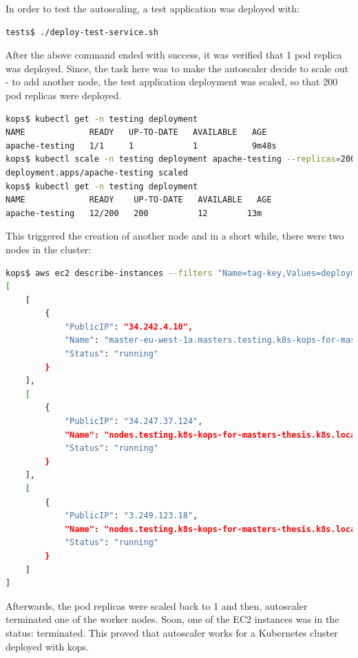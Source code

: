 In order to test the autoscaling, a test application was deployed with:
\begin{lstlisting}[basicstyle=\tiny,caption={TODO},captionpos=b,language=Bash,xleftmargin=1cm]
tests$ ./deploy-test-service.sh
\end{lstlisting}
After the above command ended with success, it was verified that 1 pod replica was deployed. Since, the task here was to make the autoscaler decide to scale out - to add another node, the test application deployment was scaled, so that 200 pod replicas were deployed.
\begin{lstlisting}[basicstyle=\tiny,caption={TODO},captionpos=b,language=Bash,xleftmargin=1cm]
kops$ kubectl get -n testing deployment
NAME             READY   UP-TO-DATE   AVAILABLE   AGE
apache-testing   1/1     1            1           9m48s
kops$ kubectl scale -n testing deployment apache-testing --replicas=200
deployment.apps/apache-testing scaled
kops$ kubectl get -n testing deployment
NAME             READY    UP-TO-DATE   AVAILABLE   AGE
apache-testing   12/200   200          12        13m
\end{lstlisting}
This triggered the creation of another node and in a short while, there were two nodes in the cluster:
\begin{lstlisting}[basicstyle=\tiny,caption={TODO},captionpos=b,language=Bash,xleftmargin=1cm]
kops$ aws ec2 describe-instances --filters "Name=tag-key,Values=deployment" --query "Reservations[*].Instances[*].{PublicIP:PublicIpAddress,Name:Tags[?Key=='Name']|[0].Value,Status:State.Name}"
[
    [
        {
            "PublicIP": "34.242.4.10",
            "Name": "master-eu-west-1a.masters.testing.k8s-kops-for-masters-thesis.k8s.local",
            "Status": "running"
        }
    ],
    [
        {
            "PublicIP": "34.247.37.124",
            "Name": "nodes.testing.k8s-kops-for-masters-thesis.k8s.local",
            "Status": "running"
        }
    ],
    [
        {
            "PublicIP": "3.249.123.18",
            "Name": "nodes.testing.k8s-kops-for-masters-thesis.k8s.local",
            "Status": "running"
        }
    ]
]
\end{lstlisting}
Afterwards, the pod replicas were scaled back to 1 and then, autoscaler terminated one of the worker nodes. Soon, one of the EC2 instances was in the status: terminated. This proved that autoscaler works for a Kubernetes cluster deployed with kops.

